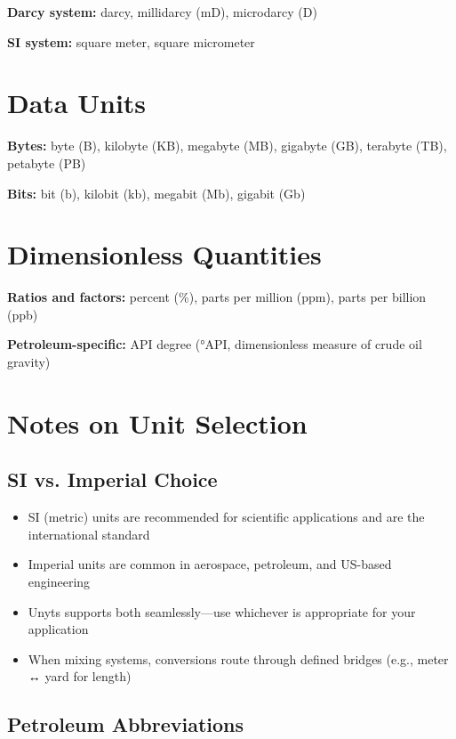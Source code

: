 \documentclass[11pt,a4paper]{report}
\begin{document}
\textbf{Darcy system:} darcy, millidarcy (mD), microdarcy (\textmu D)

\textbf{SI system:} square meter, square micrometer

\section{Data Units}

\textbf{Bytes:} byte (B), kilobyte (KB), megabyte (MB), gigabyte (GB), terabyte (TB), petabyte (PB)

\textbf{Bits:} bit (b), kilobit (kb), megabit (Mb), gigabit (Gb)

\section{Dimensionless Quantities}

\textbf{Ratios and factors:} percent (\%), parts per million (ppm), parts per billion (ppb)

\textbf{Petroleum-specific:} API degree (°API, dimensionless measure of crude oil gravity)

\section{Notes on Unit Selection}

\subsection{SI vs. Imperial Choice}

\begin{itemize}
\item SI (metric) units are recommended for scientific applications and are the international standard
\item Imperial units are common in aerospace, petroleum, and US-based engineering
\item Unyts supports both seamlessly—use whichever is appropriate for your application
\item When mixing systems, conversions route through defined bridges (e.g., meter ↔ yard for length)
\end{itemize}

\subsection{Petroleum Abbreviations}
\end{document}
